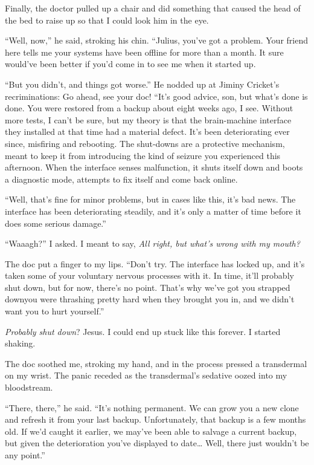 Finally, the doctor pulled up a chair and did something that caused
the head of the bed to raise up so that I could look him in the
eye.

“Well, now,” he said, stroking his chin. “Julius, you've got a
problem. Your friend here tells me your systems have been offline
for more than a month. It sure would've been better if you'd come
in to see me when it started up.

“But you didn't, and things got worse.” He nodded up at Jiminy
Cricket's recriminations: Go ahead, see your doc! “It's good
advice, son, but what's done is done. You were restored from a
backup about eight weeks ago, I see. Without more tests, I can't be
sure, but my theory is that the brain-machine interface they
installed at that time had a material defect. It's been
deteriorating ever since, misfiring and rebooting. The shut-downs
are a protective mechanism, meant to keep it from introducing the
kind of seizure you experienced this afternoon. When the interface
senses malfunction, it shuts itself down and boots a diagnostic
mode, attempts to fix itself and come back online.

“Well, that's fine for minor problems, but in cases like this, it's
bad news. The interface has been deteriorating steadily, and it's
only a matter of time before it does some serious damage.”

“Waaagh?” I asked. I meant to say,
\emph{All right, but what's wrong with my mouth?}

The doc put a finger to my lips. “Don't try. The interface has
locked up, and it's taken some of your voluntary nervous processes
with it. In time, it'll probably shut down, but for now, there's no
point. That's why we've got you strapped down{\dash}you were thrashing
pretty hard when they brought you in, and we didn't want you to
hurt yourself.”

\emph{Probably shut down}? Jesus. I could end up stuck like this
forever. I started shaking.

The doc soothed me, stroking my hand, and in the process pressed a
transdermal on my wrist. The panic receded as the transdermal's
sedative oozed into my bloodstream.

“There, there,” he said. “It's nothing permanent. We can grow you a
new clone and refresh it from your last backup. Unfortunately, that
backup is a few months old. If we'd caught it earlier, we may've
been able to salvage a current backup, but given the deterioration
you've displayed to date… Well, there just wouldn't be any point.”


